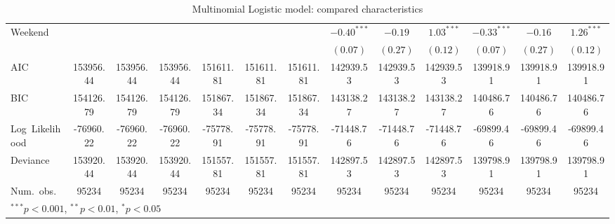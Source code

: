 \documentclass[12pt,twoside]{reedthesis}
\begin{document}
\begin{table}
\begin{center}
\begin{tiny}
\begin{tabular}{l@{} c@{} c@{} c@{} c@{} c@{} c@{} c@{} c@{} c@{} c@{} c@{} c@{} }
  Weekend            &                       &                        &                        &                        &                        &                        & $\mathbf{-0.40}^{***}$ & $-0.19$                & $\mathbf{1.03}^{***}$  & $\mathbf{-0.33}^{***}$ & $-0.16$                & $\mathbf{1.26}^{***}$  \\
                     &                       &                        &                        &                        &                        &                        & $(0.07)$               & $(0.27)$               & $(0.12)$               & $(0.07)$               & $(0.27)$               & $(0.12)$               \\
  \midrule
  AIC                & 153956.44             & 153956.44              & 153956.44              & 151611.81              & 151611.81              & 151611.81              & 142939.53              & 142939.53              & 142939.53              & 139918.91              & 139918.91              & 139918.91              \\
  BIC                & 154126.79             & 154126.79              & 154126.79              & 151867.34              & 151867.34              & 151867.34              & 143138.27              & 143138.27              & 143138.27              & 140486.76              & 140486.76              & 140486.76              \\
  Log\ Likelihood    & -76960.22             & -76960.22              & -76960.22              & -75778.91              & -75778.91              & -75778.91              & -71448.76              & -71448.76              & -71448.76              & -69899.46              & -69899.46              & -69899.46              \\
  Deviance           & 153920.44             & 153920.44              & 153920.44              & 151557.81              & 151557.81              & 151557.81              & 142897.53              & 142897.53              & 142897.53              & 139798.91              & 139798.91              & 139798.91              \\
  Num.\ obs.         & 95234                 & 95234                  & 95234                  & 95234                  & 95234                  & 95234                  & 95234                  & 95234                  & 95234                  & 95234                  & 95234                  & 95234                  \\
  \bottomrule
  \multicolumn{13}{l}{\tiny{$^{***}p<0.001$, $^{**}p<0.01$, $^*p<0.05$}}
  \end{tabular}
  \end{tiny}
  \caption{Multinomial Logistic model: compared characteristics}
  \label{table:coefficients}
  \end{center}
  \end{table}
  
\end{document}
